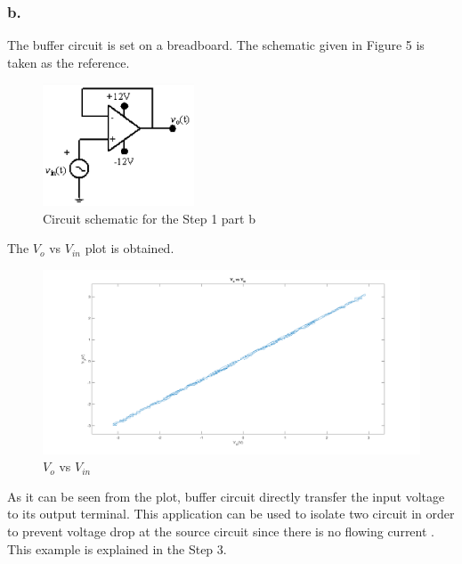 \documentclass[letterpaper,12pt]{article}
\begin{document}
\subsubsection{b.}
The buffer circuit is set on a breadboard. The schematic given in Figure 5 is taken as the reference.
\begin{figure}[H]
	\centering
   \includegraphics[width=0.4\textwidth]{circuit2.png}
   \caption{Circuit schematic for the Step 1 part b}
\end{figure} 
The \(V_{o} \) vs \( V_{in}\) plot is obtained. 
\begin{figure}[H]
	\centering
   \includegraphics[width=1\textwidth]{e_1_b.png}
   \caption{\(V_{o} \) vs \( V_{in}\)}
\end{figure} 
As it can be seen from the plot, buffer circuit directly transfer the input voltage to its output terminal. This application can be used to isolate two circuit in order to prevent voltage drop at the source circuit since there is no flowing current . This example is explained in the Step 3. 
\end{document}
